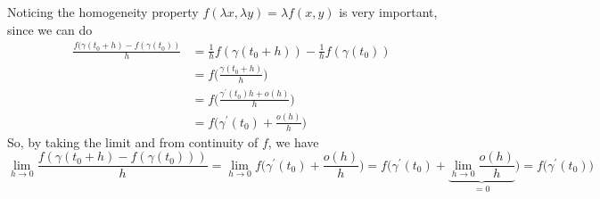 \begin{solution}
\begin{enumerate}
				Noticing the homogeneity property $f(\lambda x, \lambda y) = \lambda f(x, y)$ is very important, since we can do 
				\begin{align}
					\frac{f(\gamma(t_0 + h) - f(\gamma(t_0))}{h} 
						& = \frac{1}{h} f(\gamma(t_0 + h)) - \frac{1}{h} f(\gamma(t_0)) \\ 
						& = f\bigg( \frac{\gamma(t_0 + h)}{h} \bigg) \\ 
						& = f\bigg( \frac{\gamma^\prime (t_0) h + o(h)}{h} \bigg) \\ 
						& = f \big( \gamma^\prime (t_0) + \frac{o(h)}{h} \big)
				\end{align}
				So, by taking the limit and from continuity of $f$, we have 
				\begin{equation}
					\lim_{h \to 0} \frac{f(\gamma(t_0 + h) - f(\gamma(t_0)))}{h} = \lim_{h \to 0} f \big( \gamma^\prime (t_0) + \frac{o(h)}{h} \big) = f \big( \gamma^\prime (t_0) + \underbrace{\lim_{h \to 0} \frac{o(h)}{h}}_{= 0} \big) = f \big( \gamma^\prime (t_0) \big)
				\end{equation}


\end{enumerate}
\end{solution}
